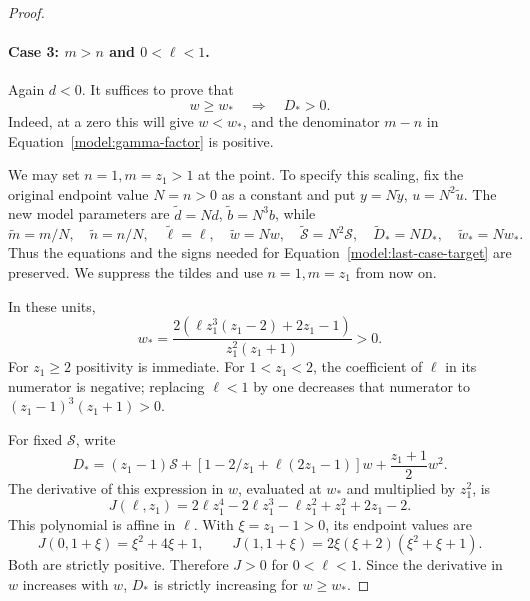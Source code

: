 \begin{proof}
\paragraph{Case 3: \(m>n\) and \(0<\ell<1\).}
Again \(d<0\).  It suffices to prove that
\begin{equation}
 w\ge w_*\quad\Longrightarrow\quad D_*>0.
 \label{model:last-case-target}
\end{equation}
Indeed, at a zero this will give \(w<w_*\), and the denominator
\(m-n\) in Equation~\eqref{model:gamma-factor} is positive.

We may set \(n=1,m=z_1>1\) at the point.  To specify this scaling, fix
the original endpoint value \(N=n>0\) as a constant and put
\(y=N\widetilde y\), \(u=N^2\widetilde u\).
The new model parameters are
\(\widetilde d=Nd\), \(\widetilde b=N^3b\), while
\[
 \widetilde m=m/N,\quad \widetilde n=n/N,\quad
 \widetilde\ell=\ell,\quad
 \widetilde w=Nw,\quad
 \widetilde{\mathcal S}=N^2\mathcal S,\quad
 \widetilde D_*=ND_*,\quad \widetilde w_*=Nw_*.
\]
Thus the equations and the signs needed for
Equation~\eqref{model:last-case-target} are preserved.  We suppress
the tildes and use \(n=1,m=z_1\) from now on.

In these units,
\begin{equation}
 w_*=\frac{2(\ell z_1^3(z_1-2)+2z_1-1)}{z_1^2(z_1+1)}>0.
 \label{model:scaled-wstar}
\end{equation}
For \(z_1\ge2\) positivity is immediate.  For \(1<z_1<2\), the coefficient
of \(\ell\) in its numerator is negative; replacing \(\ell<1\)
by one decreases that numerator to
\((z_1-1)^3(z_1+1)>0\).

For fixed \(\mathcal S\), write
\[
 D_*=(z_1-1)\mathcal S+
       [1-2/z_1+\ell(2z_1-1)]w+\frac{z_1+1}{2}w^2.
\]
The derivative of this expression in \(w\), evaluated at \(w_*\) and
multiplied by \(z_1^2\), is
\begin{equation}
 J(\ell,z_1)=2\ell z_1^4-2\ell z_1^3-\ell z_1^2+z_1^2+2z_1-2.
 \label{model:J-polynomial}
\end{equation}
This polynomial is affine in \(\ell\).  With \(\xi=z_1-1>0\), its
endpoint values are
\[
 J(0,1+\xi)=\xi^2+4\xi+1,\qquad
 J(1,1+\xi)=2\xi(\xi+2)(\xi^2+\xi+1).
\]
Both are strictly positive.  Therefore \(J>0\) for \(0<\ell<1\).
Since the derivative in \(w\) increases with \(w\), \(D_*\) is
strictly increasing for \(w\ge w_*\).


\end{proof}
